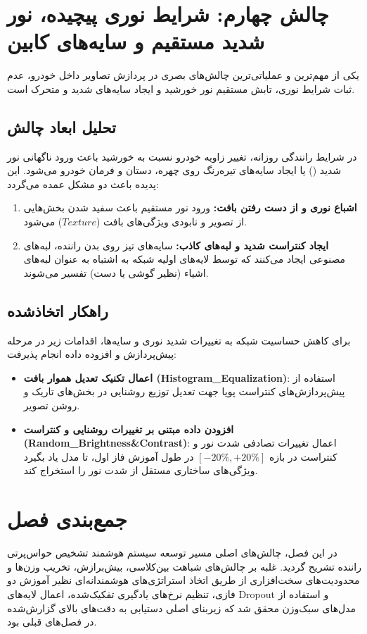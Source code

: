 \documentclass{report}
\begin{document}
 	
 	
 	
 	
 	\section{چالش چهارم: شرایط نوری پیچیده، نور شدید مستقیم و سایه‌های کابین}
 	یکی از مهم‌ترین و عملیاتی‌ترین چالش‌های بصری در پردازش تصاویر داخل خودرو، عدم ثبات شرایط نوری، تابش مستقیم نور خورشید و ایجاد سایه‌های شدید و متحرک است.
 	
 	\subsection{تحلیل ابعاد چالش}
 	در شرایط رانندگی روزانه، تغییر زاویه خودرو نسبت به خورشید باعث ورود ناگهانی نور شدید () یا ایجاد سایه‌های تیره‌رنگ روی چهره، دستان و فرمان خودرو می‌شود. این پدیده باعث دو مشکل عمده می‌گردد:
 	\begin{enumerate}
 		\item \textbf{اشباع نوری و از دست رفتن بافت:} ورود نور مستقیم باعث سفید شدن بخش‌هایی از تصویر و نابودی ویژگی‌های بافت ($Texture$) می‌شود.
 		\item \textbf{ایجاد کنتراست شدید و لبه‌های کاذب:} سایه‌های تیز روی بدن راننده، لبه‌های مصنوعی ایجاد می‌کنند که توسط لایه‌های اولیه شبکه به اشتباه به عنوان لبه‌های اشیاء (نظیر گوشی یا دست) تفسیر می‌شوند.
 	\end{enumerate}
 	
 	\subsection{راهکار اتخاذشده}
 	برای کاهش حساسیت شبکه به تغییرات شدید نوری و سایه‌ها، اقدامات زیر در مرحله پیش‌پردازش و افزوده داده انجام پذیرفت:
 	\begin{itemize}
 		\item \textbf{اعمال تکنیک تعدیل هموار بافت (Histogram\_Equalization)}: استفاده از پیش‌پردازش‌های کنتراست پویا جهت تعدیل توزیع روشنایی در بخش‌های تاریک و روشن تصویر.
 		\item \textbf{افزودن داده مبتنی بر تغییرات روشنایی و کنتراست (Random\_Brightness\&Contrast)}: اعمال تغییرات تصادفی شدت نور و کنتراست در بازه $[-20\%, +20\%]$ در طول آموزش فاز اول، تا مدل یاد بگیرد ویژگی‌های ساختاری مستقل از شدت نور را استخراج کند.
 	\end{itemize}
 	
 	
 	
 	
 	
 	\section{جمع‌بندی فصل}
 	در این فصل، چالش‌های اصلی مسیر توسعه سیستم هوشمند تشخیص حواس‌پرتی راننده تشریح گردید. غلبه بر چالش‌های شباهت بین‌کلاسی، بیش‌برازش، تخریب وزن‌ها و محدودیت‌های سخت‌افزاری از طریق اتخاذ استراتژی‌های هوشمندانه‌ای نظیر آموزش دو فازی، تنظیم نرخ‌های یادگیری تفکیک‌شده، اعمال لایه‌های Dropout و استفاده از مدل‌های سبک‌وزن محقق شد که زیربنای اصلی دستیابی به دقت‌های بالای گزارش‌شده در فصل‌های قبلی بود.
 	
\end{document}
